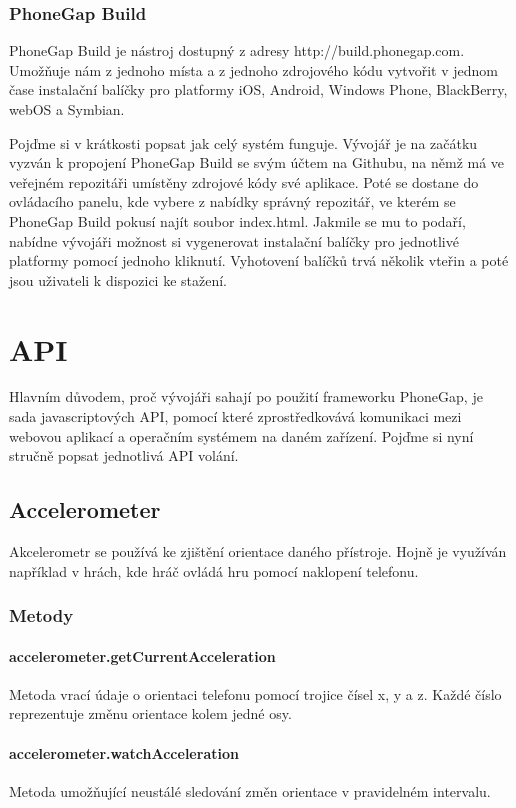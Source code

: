\subsubsection{PhoneGap Build} \label{Sec:PhoneGapBuild}
PhoneGap Build je nástroj dostupný z adresy http://build.phonegap.com. Umožňuje nám z jednoho místa a z jednoho zdrojového kódu vytvořit v jednom čase instalační balíčky pro platformy iOS, Android, Windows Phone, BlackBerry, webOS a Symbian.

Pojďme si v krátkosti popsat jak celý systém funguje. Vývojář je na začátku vyzván k propojení PhoneGap Build se svým účtem na Githubu, na němž má ve veřejném repozitáři umístěny zdrojové kódy své aplikace. Poté se dostane do ovládacího panelu, kde vybere z nabídky správný repozitář, ve kterém se PhoneGap Build pokusí najít soubor index.html. Jakmile se mu to podaří, nabídne vývojáři možnost si vygenerovat instalační balíčky pro jednotlivé platformy pomocí jednoho kliknutí. Vyhotovení balíčků trvá několik vteřin a poté jsou uživateli k dispozici ke stažení.

\section{API} \label{Sec:API}
Hlavním důvodem, proč vývojáři sahají po použití frameworku PhoneGap, je sada javascriptových API, pomocí které zprostředkovává komunikaci mezi webovou aplikací a operačním systémem na daném zařízení. Pojďme si nyní stručně popsat jednotlivá API volání.

\subsection{Accelerometer}
Akcelerometr se používá ke zjištění orientace daného přístroje. Hojně je využíván například v hrách, kde hráč ovládá hru pomocí naklopení telefonu.

\subsubsection{Metody}
\paragraph{accelerometer.getCurrentAcceleration}
Metoda vrací údaje o orientaci telefonu pomocí trojice čísel x, y a z. Každé číslo reprezentuje změnu orientace kolem jedné osy.

\paragraph{accelerometer.watchAcceleration}
Metoda umožňující neustálé sledování změn orientace v pravidelném intervalu.

